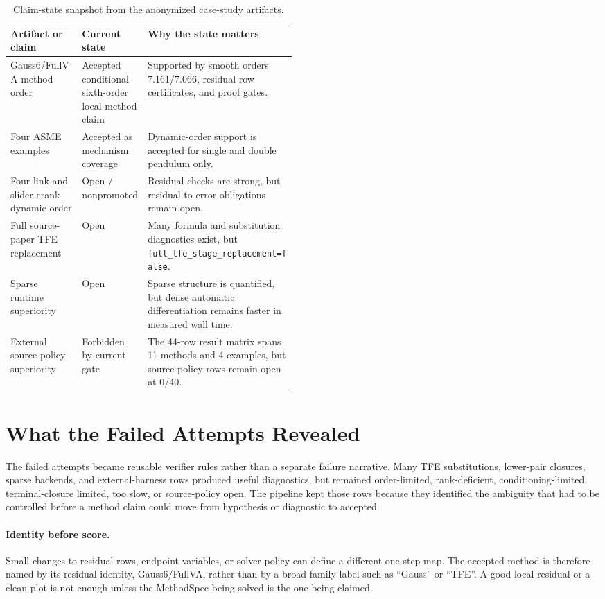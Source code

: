 \documentclass[10pt]{article}
\newcommand{\method}{Gauss6/\allowbreak FullVA}
\newcommand{\tfe}{TFE}
\newcommand{\status}[1]{\texttt{#1}}
\begin{document}
\begin{table}[!htbp]
\centering
\caption{Claim-state snapshot from the anonymized case-study artifacts.}
\label{tab:snapshot}
\small
\begin{tabularx}{\linewidth}{p{0.25\linewidth}p{0.23\linewidth}Y}
\toprule
\textbf{Artifact or claim} & \textbf{Current state} & \textbf{Why the state matters} \\
\midrule
\method{} method order & Accepted conditional sixth-order local method claim & Supported by smooth orders 7.161/7.066, residual-row certificates, and proof gates. \\
Four ASME examples & Accepted as mechanism coverage & Dynamic-order support is accepted for single and double pendulum only. \\
Four-link and slider-crank dynamic order & Open / nonpromoted & Residual checks are strong, but residual-to-error obligations remain open. \\
Full source-paper \tfe{} replacement & Open & Many formula and substitution diagnostics exist, but \status{full\_tfe\_stage\_replacement=false}. \\
Sparse runtime superiority & Open & Sparse structure is quantified, but dense automatic differentiation remains faster in measured wall time. \\
External source-policy superiority & Forbidden by current gate & The 44-row result matrix spans 11 methods and 4 examples, but source-policy rows remain open at 0/40. \\
\bottomrule
\end{tabularx}
\end{table}

\section{What the Failed Attempts Revealed}

The failed attempts became reusable verifier rules rather than a separate
failure narrative. Many \tfe{} substitutions, lower-pair closures, sparse
backends, and external-harness rows produced useful diagnostics, but remained
order-limited, rank-deficient, conditioning-limited, terminal-closure limited,
too slow, or source-policy open. The pipeline kept those rows because they
identified the ambiguity that had to be controlled before a method claim could
move from hypothesis or diagnostic to accepted.

\paragraph{Identity before score.}
Small changes to residual rows, endpoint variables, or solver policy can define
a different one-step map. The accepted method is therefore named by its
residual identity, \method{}, rather than by a broad family label such as
``Gauss'' or ``TFE''. A good local residual or a clean plot is not enough unless
the MethodSpec being solved is the one being claimed.
\end{document}
